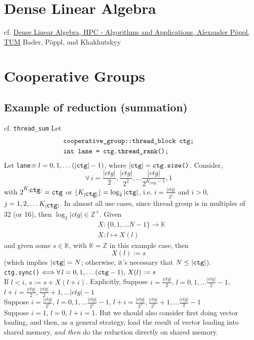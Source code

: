 \documentclass[10pt]{amsart}
\begin{document}
\begin{multicols*}{2}
\section{Dense Linear Algebra}
cf. \href{https://www5.in.tum.de/lehre/vorlesungen/hpc/WS16/tutorial/sparse_02.pdf}{Dense Linear Algebra, HPC - Algorithms and Applications, Alexander P\"oppl, TUM}
Bader, P\"{o}ppl, and Khakhutskyy \cite{BaPK2016}
\section{Cooperative Groups}  
\subsection{Example of reduction (summation)}  
cf. \verb|thread_sum|  
Let 
\[
\begin{aligned} 
& \verb|cooperative_group::thread_block ctg;|  \\
& \verb|int lane = ctg.thread_rank();|
\end{aligned}
\]
Let \verb|lane|$\equiv l = 0,1,\dots ( |\verb|ctg||-1)$, where $|\verb|ctg|| = \verb|ctg.size()|$.  
Consider, 
\[
\forall \, i = \frac{ | ctg |}{2}, \frac{| ctg|}{2^2}, \dots \frac{| ctg|}{2^{K_{| ctg |}-1}}, 1
\]
with $2^{K_{|\verb|ctg||}} = \verb|ctg|$ or $\lfloor K_{|\verb|ctg||} \rfloor = \log_2{| \verb|ctg||}$, i.e. $i = \frac{ |ctg| }{2^j}$ and $i>0$, $j=1,2,\dots K_{|\verb|ctg||}$.  
In almost all use cases, since thread group is in multiples of 32 (or 16), then $\log_2{ |ctg|} \in \mathbb{Z}^+$.  
Given 
\[
\begin{aligned}
& X:\lbrace 0 ,1,\dots N-1 \rbrace  \to \mathbb{K} \\ 
& X: l \mapsto X(l) 
\end{aligned}
\]
and given some $s\in \mathbb{K}$, with $\mathbb{K} = \mathbb{Z}$ in this example case, then 
\[
X(l):= s
\]
(which implies $|\verb|ctg|| =N$; otherwise, it's necessary that $N \leq |\verb|ctg||$).  \\
\verb|ctg.sync()| $\Longleftrightarrow  \forall \, l = 0,1,\dots (\verb|ctg|-1), \, X(l):= s $  \\
If $l<i$, $s:= s + X(l+i)$.  Explicitly, 
Suppose $i = \frac{ |ctg|}{2}$, $l=0,1,\dots \frac{|ctg|}{2} - 1$, $l+i = \frac{ |ctg|}{2}, \frac{ |ctg|}{2} + 1, \dots |ctg| - 1 $ \\ 
Suppose $i = \frac{ |ctg|}{2^2}$, $l=0,1,\dots \frac{|ctg|}{2^2} - 1$, $l+i = \frac{ |ctg|}{2^2}, \frac{ |ctg|}{2^2} + 1, \dots \frac{|ctg|}{2} - 1 $ \\ 
Suppose $i=1$, $l=0$, $l+i=1$.  
But we should also consider first doing vector loading, and then, as a general strategy, load the result of vector loading into shared memory, \emph{and then} do the reduction directly on shared memory.  

\end{multicols*}
\end{document}
